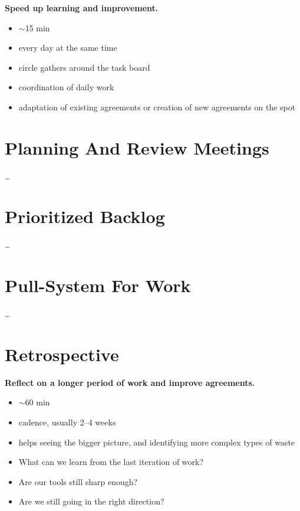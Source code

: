 \textbf{Speed up learning and improvement.}

\begin{itemize}
\item \ensuremath{\sim}15 min

\item every day at the same time

\item circle gathers around the task board

\item coordination of daily work

\item adaptation of existing agreements or creation of new agreements on the spot

\end{itemize}

\section{Planning And Review Meetings}
\label{planningandreviewmeetings}

{\ldots}

\section{Prioritized Backlog}
\label{prioritizedbacklog}

{\ldots}

\section{Pull-System For Work}
\label{pull-systemforwork}

{\ldots}

\section{Retrospective}
\label{retrospective}

\textbf{Reflect on a longer period of work and improve agreements.}

\begin{itemize}
\item \ensuremath{\sim}60 min

\item cadence, usually 2--4 weeks

\item helps seeing the bigger picture, and identifying more complex types of waste

\item What can we learn from the last iteration of work?

\item Are our tools still sharp enough?

\item Are we still going in the right direction?

\end{itemize}

